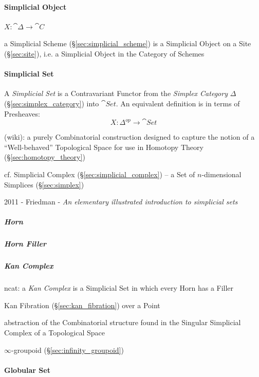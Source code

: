 \paragraph{Simplicial Object}\label{sec:simplicial_object}\hfill

$X : \cat{\Delta} \rightarrow \cat{C}$

\fist a Simplicial Scheme (\S\ref{sec:simplicial_scheme}) is a Simplicial Object
on a Site (\S\ref{sec:site}), i.e. a Simplicial Object in the Category of
Schemes



\paragraph{Simplicial Set}\label{sec:simplicial_set}\hfill

A \emph{Simplicial Set} is a Contravariant Functor from the \emph{Simplex
  Category} $\Delta$ (\S\ref{sec:simplex_category}) into $\cat{Set}$. An
equivalent definition is in terms of Presheaves:
\[
  X : \Delta^{op} \rightarrow \cat{Set}
\]

(wiki): a purely Combinatorial construction designed to capture the notion of a
``Well-behaved'' Topological Space for use in Homotopy Theory
(\S\ref{sec:homotopy_theory})

cf. Simplicial Complex (\S\ref{sec:simplicial_complex}) -- a Set of
$n$-dimensional Simplices (\S\ref{sec:simplex})

2011 - Friedman -
\emph{An elementary illustrated introduction to simplicial sets}



\subparagraph{Horn}\label{sec:horn}\hfill

\subparagraph{Horn Filler}\label{sec:horn_filler}\hfill

\subparagraph{Kan Complex}\label{sec:kan_complex}\hfill

ncat: a \emph{Kan Complex} is a Simplicial Set in which every Horn has a Filler

Kan Fibration (\S\ref{sec:kan_fibration}) over a Point

abstraction of the Combinatorial structure found in the Singular Simplicial
Complex of a Topological Space %

$\infty$-groupoid (\S\ref{sec:infinity_groupoid})



\paragraph{Globular Set}\label{sec:globular_set}\hfill

